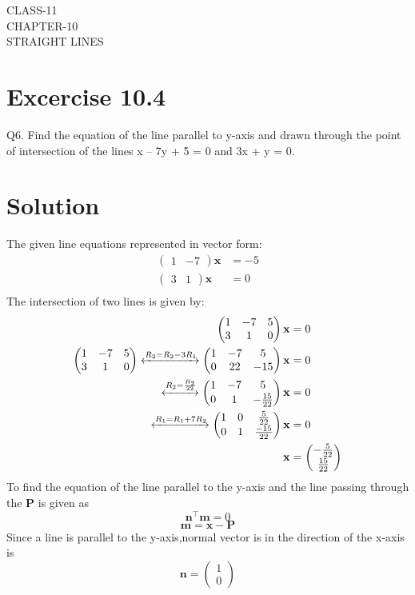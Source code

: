 \documentclass[12pt]{article}
\newcommand{\myvec}[1]{\ensuremath{\begin{pmatrix}#1\end{pmatrix}}}
\let\vec\mathbf
\begin{document}
\begin{center}
\textbf\large{CLASS-11 \\ CHAPTER-10 \\ STRAIGHT LINES}
\end{center}
\section*{Excercise 10.4}

Q6. Find the equation of the line parallel to y-axis and drawn through the point of
intersection of the lines x – 7y + 5 = 0 and 3x + y = 0.
\section*{Solution}
The given line equations represented in vector form:
\begin{align}
\myvec{1&-7}\vec{x}&=-5\\
\myvec{3&1}\vec{x}&=0\\
\end{align}
The intersection of two lines is given by:
\begin{align}
\myvec{
1&-7&5\\
3&1&0
} \vec{x}&=0\\
\myvec{
1&-7&5\\
3&1&0
}
\xleftrightarrow[]{R_2=R_2-3R_1}
\myvec{
1&-7&5\\
0&22&-15
}\vec{x}&=0\\\xleftrightarrow[]{R_2=\frac{R_2}{22}}
\myvec{
	1&-7&5\\[1pt]
0&1&-\frac{15}{22}
}\vec{x}&=0\\
\xleftrightarrow[]{R_1={R_1}+7{R_2}}
\myvec{
1&0&\frac{5}{22}\\[1pt]
0&1&\frac{-15}{22}
}\vec{x}&=0 \label{eq:7}\\
	\vec{x}&=\myvec{-\frac{5}{22}\\[1pt] \frac{15}{22}}\\
\end{align}
To find the equation of the line parallel to the y-axis and the line passing through the $\vec{P}$ is given as
\begin{equation}
    \vec{n}^{\top}\vec{m}=0
    \label{eq:line}
\end{equation}
\begin{equation}
    \vec{m}=\vec{x}-\vec{P}
    \label{eq:direction}
\end{equation}
Since a line is parallel to the y-axis,normal vector is in the direction of the x-axis is
\begin{equation}
    \vec{n}=\myvec{1\\0}
    \label{eq:normal}
\end{equation}
\end{document}
